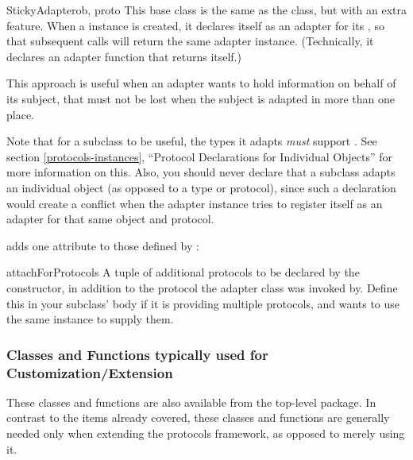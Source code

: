 \begin{verbatim%
}
\begin{verbatim%
}
\begin{verbatim%
}
\begin{verbatim%
}
\begin{verbatim%
}
\begin{verbatim%
}
\begin{classdesc}{StickyAdapter}{ob, proto}
This base class is the same as the  class, but with an extra
feature.  When a  instance is created, it declares itself
as an adapter for its , so that subsequent 
calls will return the same adapter instance.  (Technically, it declares an
adapter function that returns itself.)

This approach is useful when an adapter wants to hold information on behalf of
its subject, that must not be lost when the subject is adapted in
more than one place.

Note that for a  subclass to be useful, the types it
adapts \emph{must} support .  See section
\ref{protocols-instances}, ``Protocol Declarations for Individual Objects'' for
more information on this.  Also, you should never declare that a
 subclass adapts an individual object (as opposed to a
type or protocol), since such a declaration would create a conflict when the
adapter instance tries to register itself as an adapter for that same object
and protocol.

 adds one attribute to those defined by :

\begin{memberdesc}{attachForProtocols}
A tuple of additional protocols to be declared by the constructor, in
addition to the protocol the adapter class was invoked by.  Define this in
your subclass' body if it is providing multiple protocols, and wants to
use the same instance to supply them.
\end{memberdesc}

\end{classdesc}









\newpage
\subsubsection{Classes and Functions typically used for Customization/Extension}

These classes and functions are also available from the top-level
 package.  In contrast to the items already covered, these
classes and functions are generally needed only when extending the protocols
framework, as opposed to merely using it.


\end{verbatim%
}
\end{verbatim%
}
\end{verbatim%
}
\end{verbatim%
}
\end{verbatim%
}
\end{verbatim%
}
